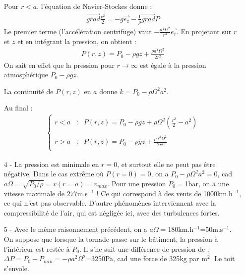 \documentclass{report}
\begin{document}
\begin{itemize}
Pour $r<a$, l'équation de Navier-Stockes donne : 
\begin{align*}
\vec{grad}\frac{v^2}{2}=-g\vec{e_z}-\frac{1}{\rho}\vec{grad}P
\end{align*}
	Le premier terme (l'accélération centrifuge) vaut $-\frac{a^4\Omega^2}{r^3}\vec{e_r}$. En projetant sur $r$ et $z$ et en intégrant la pression, on obtient :
	\begin{align*}
		P(r,z) = P_0 -\rho g z+ \frac{\rho a^4\Omega^2}{2r^2}
	\end{align*}
	On sait en effet que la pression pour $r\longrightarrow\infty$ est égale à la pression atmosphérique $P_0-\rho gz$.
	
La continuité de $P(r,z)$ en $a$ donne $k=P_0-\rho \Omega^2a^2$.

Au final :
\begin{align*}
	\left\lbrace
\begin{array}{ccc}
r<a & : & P(r,z) = P_0 -\rho g z +\rho\Omega^2(\frac{r^2}{2} -a^2) \\
 & & \\
r>a & : & P(r,z) = P_0 -\rho g z+ \frac{\rho a^4\Omega^2}{2r^2} \\
\end{array}\right.
\end{align*}

\item[4 - ] La pression est minimale en $r=0$, et surtout elle ne peut pas être négative. Dans le cas extrême où $P(r=0)=0$, on a $P_0-\rho\Omega^2a^2=0$, cad $a\Omega=\sqrt{P_0/\rho}=v(r=a)=v_{max}$.
Pour une pression $P_0=$1bar, on a une vitesse maximale de $277$m.s$^{-1}$ ! Ce qui correspond à des vents de 1000km.h$^{-1}$, ce qui n'est pas observable. D'autre phénomènes interviennent avec la compressibilité de l'air, qui est négligée ici, avec des turbulences fortes.

\item[5 - ] Avec le même raisonnement précédent, on a $a\Omega=$180km.h$^{-1}$=50m.s$^{-1}$. On suppose que lorsque la tornade passe sur le bâtiment, la pression à l'intérieur est restée à $P_0$. Il s'ne suit une différence de pression de : $\Delta P = P_0 -P_{min}=-\rho a^2\Omega^2$=3250Pa, cad une force de 325kg par m$^2$. Le toit s'envole.

\end{itemize}
\end{document}
